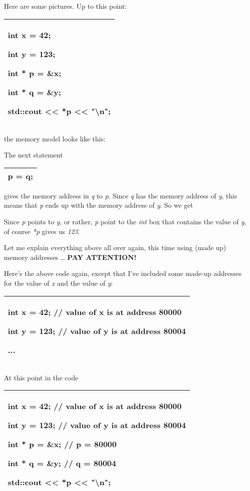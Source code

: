 \documentclass[
]{article}
\begin{document}
Here are some pictures. Up to this point:

\begin{longtable}[]{@{}l@{}}
\toprule
\endhead
\begin{minipage}[t]{0.97\columnwidth}\raggedright
int x = 42;

int y = 123;

int * p = \&x;

int * q = \&y;

std::cout \textless\textless{} *p \textless\textless{}
"\textbackslash n";\strut
\end{minipage}\tabularnewline
\bottomrule
\end{longtable}

the memory model looks like this:

The next statement

\begin{longtable}[]{@{}l@{}}
\toprule
\endhead
p = q;\tabularnewline
\bottomrule
\end{longtable}

gives the memory address in \emph{q} to \emph{p}. Since \emph{q} has the
memory address of \emph{y}, this means that \emph{p} ends up with the
memory address of \emph{y}. So we get

Since \emph{p} points to \emph{y}, or rather, \emph{p} point to the
\emph{int} box that contains the value of \emph{y}, of course \emph{*p}
gives us \emph{123}.

Let me explain everything above all over again, this time using (made
up) memory addresses \ldots{} \textbf{PAY ATTENTION!}

Here's the above code again, except that I've included some made-up
addresses for the value of \emph{x} and the value of \emph{y}:

\begin{longtable}[]{@{}l@{}}
\toprule
\endhead
\begin{minipage}[t]{0.97\columnwidth}\raggedright
int x = 42; // value of x is at address 80000

int y = 123; // value of y is at address 80004

...\strut
\end{minipage}\tabularnewline
\bottomrule
\end{longtable}

At this point in the code

\begin{longtable}[]{@{}l@{}}
\toprule
\endhead
\begin{minipage}[t]{0.97\columnwidth}\raggedright
int x = 42; // value of x is at address 80000

int y = 123; // value of y is at address 80004

int * p = \&x; // p = 80000

int * q = \&y; // q = 80004

std::cout \textless\textless{} *p \textless\textless{}
"\textbackslash n";\strut
\end{minipage}\tabularnewline
\bottomrule
\end{longtable}
\end{document}

